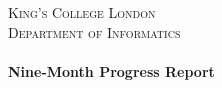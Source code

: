 






\textsc{\huge King's College London}\\[1.5cm]

\textsc{\LARGE Department of Informatics}\\[1.5cm]



\HRule \\[0.4cm]
{ \LARGE \bfseries Nine-Month Progress Report}\\[0.4cm]

\HRule \\[1.5cm]

